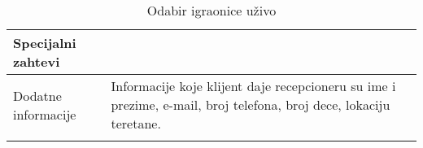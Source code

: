 \documentclass[../../main.tex]{subfiles}
\begin{document}
\begin{longtable}{| p{} | p{} |}
\\
\hline
    Specijalni zahtevi & \\
\hline
    Dodatne informacije &
     Informacije koje klijent daje recepcioneru su ime i prezime, e-mail, broj telefona, broj dece, lokaciju teretane.
    \\
\hline
\caption{Odabir igraonice uživo}
\end{longtable}
\end{document}
